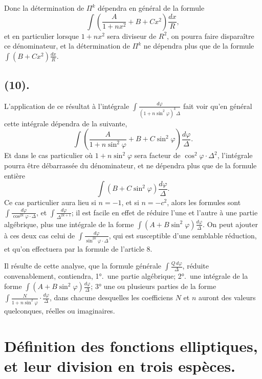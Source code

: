 \documentclass{article}
\begin{document}
Donc la détermination de $\Pi^{k}$ dépendra en général de la formule
\[ \int\left(\frac{A}{1+nx^{2}}+B+Cx^{2}\right)\frac{dx}{R}, \]
et en particulier lorsque $1+nx^{2}$ sera diviseur de $R^{2}$, on pourra faire disparaître ce dénominateur, et la détermination de $\Pi^{k}$ ne dépendra plus que de la formule $\displaystyle\int(B+Cx^{2})\frac{dx}{R}$.


\subsection*{(10).}

L'application de ce résultat à l'intégrale $\displaystyle\int\frac{d\varphi}{(1+n\sin^{2}\varphi)^{k}\Delta}$ fait voir qu'en général cette intégrale dépendra de la suivante,
\[ \int\left(\frac{A}{1+n\sin^{2}\varphi}+B+C\sin^{2}\varphi\right)\frac{d\varphi}{\Delta}. \]
Et dans le cas particulier où $1+n\sin^{2}\varphi$ sera facteur de $\cos^{2}\varphi\cdot\Delta^{2}$, l'intégrale pourra être débarrassée du dénominateur, et ne dépendra plus que de la formule entière
\[ \int(B+C\sin^{2}\varphi)\frac{d\varphi}{\Delta}. \]
Ce cas particulier aura lieu si $n=-1$, et si $n=-c^{2}$, alors les formules sont $\displaystyle\int\frac{d\varphi}{\cos^{2k}\varphi\cdot\Delta}$, et $\displaystyle\int\frac{d\varphi}{\Delta^{2k+1}}$; il est facile en effet de réduire l'une et l'autre à une partie algébrique, plus une intégrale de la forme $\displaystyle\int(A+B\sin^{2}\varphi)\frac{d\varphi}{\Delta}$. On peut ajouter à ces deux cas celui de $\displaystyle\int\frac{d\varphi}{\sin^{2k}\varphi\cdot\Delta}$, qui est susceptible d'une semblable réduction, et qu'on effectuera par la formule de l'article 8.

Il résulte de cette analyse, que la formule générale $\displaystyle\int\frac{Q\,d\varphi}{\Delta}$, réduite convenablement, contiendra, 1°.\ une partie algébrique; 2°.\ une intégrale de la forme $\displaystyle\int(A+B\sin^{2}\varphi)\frac{d\varphi}{\Delta}$; 3° une ou plusieurs parties de la forme $\displaystyle\int\frac{N}{1+n\sin^{2}\varphi}\cdot\frac{d\varphi}{\Delta}$, dans chacune desquelles les coefficiens $N$ et $n$ auront des valeurs quelconques, réelles ou imaginaires.

\section*{Définition des fonctions elliptiques, et leur division en trois espèces.}
\end{document}
